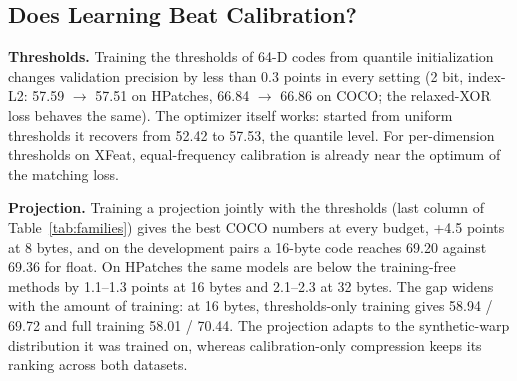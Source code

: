 \documentclass[10pt,conference]{IEEEtran}
\begin{document}
\subsection{Does Learning Beat Calibration?}
\textbf{Thresholds.} Training the thresholds of 64-D codes from quantile initialization changes validation precision by less than 0.3 points in every setting (2 bit, index-L2: 57.59 $\rightarrow$ 57.51 on HPatches, 66.84 $\rightarrow$ 66.86 on COCO; the relaxed-XOR loss behaves the same). The optimizer itself works: started from uniform thresholds it recovers from 52.42 to 57.53, the quantile level. For per-dimension thresholds on XFeat, equal-frequency calibration is already near the optimum of the matching loss.

\textbf{Projection.} Training a projection jointly with the thresholds (last column of Table~\ref{tab:families}) gives the best COCO numbers at every budget, +4.5 points at 8 bytes, and on the development pairs a 16-byte code reaches 69.20 against 69.36 for float. On HPatches the same models are below the training-free methods by 1.1--1.3 points at 16 bytes and 2.1--2.3 at 32 bytes. The gap widens with the amount of training: at 16 bytes, thresholds-only training gives 58.94 / 69.72 and full training 58.01 / 70.44. The projection adapts to the synthetic-warp distribution it was trained on, whereas calibration-only compression keeps its ranking across both datasets.
\end{document}
